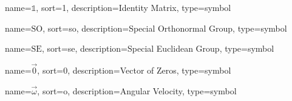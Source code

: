 	{%
		name=\ensuremath{\mathds{1}},
		sort=1,
		description=Identity Matrix,
		type=symbol
	}
	\newcommand{\id}{\gls{sym:id}}

	{%
		name=\ensuremath{\mathrm{SO}},
		sort=so,
		description=Special Orthonormal Group,
		type=symbol
	}
	\newcommand{\specialOrthonormalGroupbare}{\gls{sym:specialOrthonormalGroup}}
	\newcommand{\specialOrthonormalGroup}[1]{\ensuremath{\specialOrthonormalGroupbare_{#1}}}

	{%
		name=\ensuremath{\mathrm{SE}},
		sort=se,
		description=Special Euclidean Group,
		type=symbol
	}
	\newcommand{\specialEuclideanGroupbare}{\gls{sym:specialEuclideanGroup}}
	\newcommand{\specialEuclideanGroup}[1]{\ensuremath{\specialEuclideanGroupbare_{#1}}}

	{%
		name=\ensuremath{\vec{0}},
		sort=0,
		description=Vector of Zeros,
		type=symbol
	}
	\newcommand{\zerovec}{\gls{sym:zerovec}}


	{%
		name=\ensuremath{\vec{\omega}},
		sort=o,
		description=Angular Velocity,
		type=symbol
	}
	\newcommand{\avel}{\gls{sym:avel}}

